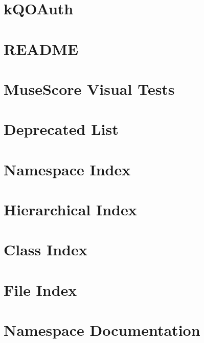 \documentclass[twoside]{book}
\newcommand{\+}{\discretionary{\mbox{\scriptsize$\hookleftarrow$}}{}{}}
\begin{document}
\chapter{k\+Q\+O\+Auth}
\label{md_thirdparty_k_q_o_auth__r_e_a_d_m_e}

\chapter{R\+E\+A\+D\+ME}
\label{md_thirdparty_ofqf__r_e_a_d_m_e}

\chapter{Muse\+Score Visual Tests}
\label{md_vtest__r_e_a_d_m_e}

\chapter{Deprecated List}
\label{deprecated}

\chapter{Namespace Index}

\chapter{Hierarchical Index}

\chapter{Class Index}

\chapter{File Index}

\chapter{Namespace Documentation}



\end{document}
